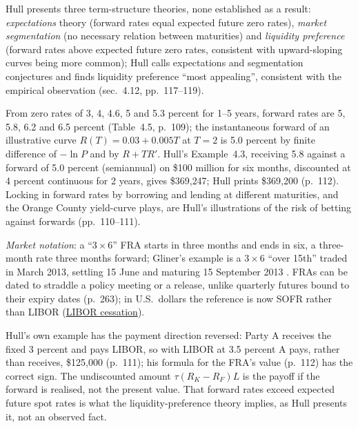 \begin{qfmodel}
Hull presents three term-structure theories, none established as a result: \emph{expectations} theory (forward rates equal expected future zero rates), \emph{market segmentation} (no necessary relation between maturities) and \emph{liquidity preference} (forward rates above expected future zero rates, consistent with upward-sloping curves being more common); Hull calls expectations and segmentation conjectures and finds liquidity preference ``most appealing'', consistent with the empirical observation (sec.~4.12, pp.~117--119).

 From zero rates of 3, 4, 4.6, 5 and 5.3 percent for 1--5 years, forward rates are 5, 5.8, 6.2 and 6.5 percent (Table~4.5, p.~109); the instantaneous forward of an illustrative curve $R(T)=0.03+0.005T$ at $T=2$ is 5.0 percent by finite difference of $-\ln P$ and by $R+TR'$. Hull's Example~4.3, receiving 5.8 against a forward of 5.0 percent (semiannual) on \$100 million for six months, discounted at 4 percent continuous for 2 years, gives \$369{,}247; Hull prints \$369{,}200 (p.~112). Locking in forward rates by borrowing and lending at different maturities, and the Orange County yield-curve plays, are Hull's illustrations of the risk of betting against forwards (pp.~110--111).

\emph{Market notation}: a ``$3\times6$'' FRA starts in three months and ends in six, a three-month rate three months forward; Gliner's example is a $3\times6$ ``over 15th'' traded in March 2013, settling 15 June and maturing 15 September 2013 \citep[chap.~9, sec.\ ``Forward Rate Agreements (FRAs)'', PDF p.~263]{s7-gliner}. FRAs can be dated to straddle a policy meeting or a release, unlike quarterly futures bound to their expiry dates (p.~263); in U.S.\ dollars the reference is now SOFR rather than LIBOR (\hyperref[meth:policy-path-ois-futures]{LIBOR cessation}).

 Hull's own example has the payment direction reversed: Party A receives the fixed 3 percent and pays LIBOR, so with LIBOR at 3.5 percent A pays, rather than receives, \$125{,}000 (p.~111); his formula for the FRA's value (p.~112) has the correct sign. The undiscounted amount $\tau(R_K-R_F)L$ is the payoff if the forward is realised, not the present value. That forward rates exceed expected future spot rates is what the liquidity-preference theory implies, as Hull presents it, not an observed fact.


\end{qfmodel}
